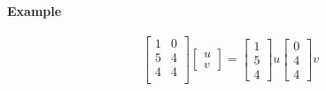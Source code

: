 \paragraph{Example}

\[
	\begin{bmatrix}
		1 & 0 \\ 5 & 4 \\ 4 & 4 \\
	\end{bmatrix}
	\begin{bmatrix}
		u \\ v
	\end{bmatrix} 
	=
	\begin{bmatrix}
		1 \\ 5 \\ 4
	\end{bmatrix} u
	\begin{bmatrix}
		0 \\ 4 \\ 4
	\end{bmatrix} v
\]